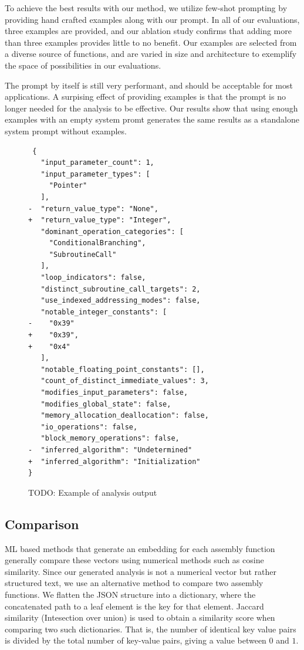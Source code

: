 \documentclass[conference,compsoc]{IEEEtran}
\begin{document}
To achieve the best results with our method, we utilize few-shot prompting by providing hand crafted examples along with our prompt.
In all of our evaluations, three examples are provided, and our ablation study confirms that adding more than three examples provides
little to no benefit. Our examples are selected from a diverse source of functions, and are varied in size and architecture to
exemplify the space of possibilities in our evaluations.

The prompt by itself is still very performant, and should be acceptable for most applications. A surpising effect of providing examples
is that the prompt is no longer needed for the analysis to be effective. Our results show that using enough examples with an empty system promt
generates the same results as a standalone system prompt without examples.

\begin{figure}[ht]
\centering
\begin{minipage}{0.95\linewidth}
\begin{verbatim}
 {
   "input_parameter_count": 1,
   "input_parameter_types": [
     "Pointer"
   ],
-  "return_value_type": "None",
+  "return_value_type": "Integer",
   "dominant_operation_categories": [
     "ConditionalBranching",
     "SubroutineCall"
   ],
   "loop_indicators": false,
   "distinct_subroutine_call_targets": 2,
   "use_indexed_addressing_modes": false,
   "notable_integer_constants": [
-    "0x39"
+    "0x39",
+    "0x4"
   ],
   "notable_floating_point_constants": [],
   "count_of_distinct_immediate_values": 3,
   "modifies_input_parameters": false,
   "modifies_global_state": false,
   "memory_allocation_deallocation": false,
   "io_operations": false,
   "block_memory_operations": false,
-  "inferred_algorithm": "Undetermined"
+  "inferred_algorithm": "Initialization"
}
\end{verbatim}
\caption{TODO: Example of analysis output}
\label{feature-diff}
\end{minipage}
\end{figure}

\subsection{Comparison}

ML based methods that generate an embedding for each assembly function generally compare these vectors using numerical
methods such as cosine similarity.  Since our generated analysis is not a numerical vector but rather structured text,
we use an alternative method to compare two assembly functions. We flatten the JSON structure into a dictionary, where the
concatenated path to a leaf element is the key for that element. Jaccard similarity (Intesection over union) is used to
obtain a similarity score when comparing two such dictionaries. That is, the number of identical key value pairs is
divided by the total number of key-value pairs, giving a value between \(0\) and \(1\).
\end{document}
